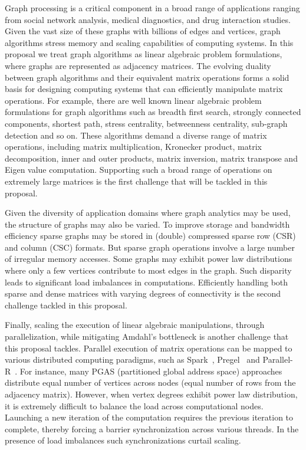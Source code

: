 \noindent
Graph processing is a critical component in a broad range of applications ranging from social network analysis, medical diagnostics, and drug interaction studies.  
Given the vast size of these graphs with billions of edges and vertices, graph algorithms stress memory and scaling capabilities of computing systems. 
In this proposal we treat graph algorithms as linear algebraic problem formulations, where graphs are represented as adjacency matrices.  
The evolving duality between graph algorithms and their equivalent matrix operations forms a solid basis for designing computing systems that can efficiently manipulate matrix operations.  
For example, there are well known linear algebraic problem formulations for graph algorithms such as breadth first search, strongly connected components, shortest path, stress centrality, betweenness centrality, sub-graph detection and so on.  
These algorithms demand a diverse range of matrix operations, including matrix multiplication, Kronecker product,  matrix decomposition, inner and outer products, matrix inversion, matrix transpose and Eigen value computation.  
Supporting such a broad range of operations on extremely large matrices is the first challenge that will be tackled in this proposal. 


Given the diversity of application domains where graph analytics may be used, the structure of graphs may also be varied. 
To improve storage and bandwidth efficiency sparse graphs may be stored in  (double) compressed sparse row (CSR) and column (CSC) formats. 
But sparse graph operations involve a large number of irregular memory accesses.
Some graphs may exhibit power law distributions where only a few vertices contribute to most edges in the graph. 
Such disparity leads to significant load imbalances in computations.  
Efficiently handling both sparse and dense matrices with varying degrees of connectivity is the second challenge tackled in this proposal. 

 
Finally, scaling the execution of linear algebraic manipulations, through parallelization, while mitigating Amdahl's bottleneck is another challenge that this proposal tackles. 
Parallel execution of matrix operations can be mapped to various distributed computing paradigms, such as Spark~\cite{zaharia2010spark, MapReduce}, Pregel~\cite{pregel, Giraph} and Parallel-R~\cite{kabacoff2015r}. 
For instance, many PGAS (partitioned global address space) approaches distribute equal number of vertices across nodes (equal number of rows from the adjacency matrix). 
However, when vertex degrees exhibit power law distribution, it is extremely difficult to balance the load across computational nodes. 
Launching a new iteration of the computation requires the previous iteration to complete, thereby forcing a barrier synchronization across various threads. 
In the presence of load imbalances such synchronizations curtail scaling. 


